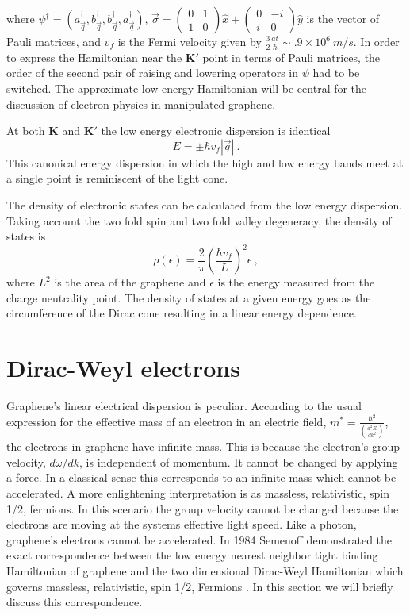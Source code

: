 where $\psi^{\dagger}=(a^{\dagger}_{\vec{q}}, b^{\dagger}_{\vec{q}},  b^{\dagger}_{\vec{q}}, a^{\dagger}_{\vec{q}})$, $\vec{\sigma}= \left( \begin{array}{cc} 0 & 1 \\ 1 & 0 \end{array} \right) \hat{x}+\left( \begin{array}{cc} 0 & -i \\ i & 0 \end{array} \right) \hat{y}$ is the vector of Pauli matrices, and $v_f$ is the Fermi velocity given by $\frac{3}{2}\frac{at}{\hbar} \sim .9 \times 10^6 \ m/s$.
In order to express the Hamiltonian near the $\bm{K'}$ point in terms of Pauli matrices, the order of the second pair of raising and lowering operators in $\psi$ had to be switched.
The approximate low energy Hamiltonian will be central for the discussion of electron physics in manipulated graphene.

At both $\bm{K}$ and $\bm{K'}$ the low energy electronic dispersion is identical
\begin{equation*}
	E=\pm \hbar v_f |\vec{q}| \ .
\end{equation*}
This canonical energy dispersion in which the high and low energy bands meet at a single point is reminiscent of the light cone.

The density of electronic states can be calculated from the low energy dispersion.
Taking account the two fold spin and two fold valley degeneracy, the density of states is 
\begin{equation}
	\rho(\epsilon)=\frac{2}{\pi} \left( \frac{\hbar v_f}{L} \right)^2 \epsilon \ ,
	\label{eq:TB:DOS}
\end{equation}
where $L^2$ is the area of the graphene and $\epsilon$ is the energy measured from the charge neutrality point.
The density of states at a given energy goes as the circumference of the Dirac cone resulting in a linear energy dependence.

\section{Dirac-Weyl electrons}
Graphene's linear electrical dispersion is peculiar.
According to the usual expression for the effective mass of an electron in an electric field, $m^*=\frac{\hbar^2}{\left(\frac{d^2 E}{d k^2}\right)}$, \cite{Kittel2005} the electrons in graphene have infinite mass.
This is because the electron's group velocity, $d \omega/d k$, is independent of momentum. 
It cannot be changed by applying a force.
In a classical sense this corresponds to an infinite mass which cannot be accelerated.
A more enlightening interpretation is as massless, relativistic, spin 1/2, fermions.
In this scenario the group velocity cannot be changed because the electrons are moving at the systems effective light speed.
Like a photon, graphene's electrons cannot be accelerated.
In 1984 Semenoff demonstrated the exact correspondence between the low energy nearest neighbor tight binding Hamiltonian of graphene and the two dimensional Dirac-Weyl Hamiltonian which governs massless, relativistic, spin 1/2, Fermions \cite{Semenoff1984}.
In this section we will briefly discuss this correspondence.

